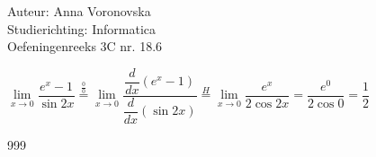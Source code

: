 \documentclass[a4paper]{article}
\begin{document}
  
\noindent \large Auteur: Anna Voronovska \\
\noindent \large Studierichting: Informatica\\
\noindent \large Oefeningenreeks 3C nr. 18.6\\

\medskip

\normalsize

$\lim\limits_{x \to 0} \dfrac{e^x - 1}{\sin 2x} \stackrel{\tfrac{0}{0}}{=} \lim\limits_{x \to 0} \dfrac{\dfrac{d}{dx}(e^x - 1)}{\dfrac{d}{dx}(\sin 2x)} \stackrel{H}{=} \lim\limits_{x \to 0} \dfrac{e^x}{2\cos 2x} = \dfrac{e^0}{2\cos 0} = \dfrac{1}{2}$


\begin{thebibliography}{999}
\end{thebibliography}
\end{document}
